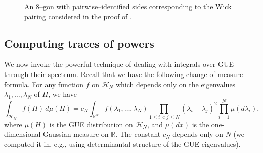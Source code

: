 \documentclass[letterpaper,11pt,oneside,reqno]{book}
\numberwithin{equation}{chapter}  %
\theoremstyle{definition}
\begin{document}
\begin{figure}[htbp]
  \centering
  \caption{An $8$–gon with pairwise–identified sides corresponding to the
           Wick pairing considered in the proof of .}
  \label{lecture15:fig:octagon-gluing}
\end{figure}

\subsection{Computing traces of powers}
\label{lecture15:subsec:traces-powers-computation}

We now invoke the powerful technique of dealing with
integrals over GUE through their spectrum.
Recall that we have the following change of measure formula.
For any function $f$ on $\mathcal{H}_N$ which depends only on the eigenvalues
$\lambda_1,\ldots,\lambda_N$ of $H$, we have
\begin{equation*}
	\int_{\mathcal{H}_N} f(H) \, d\mu(H) =
	c_N
	\int_{\mathbb{R}^N}
	f(\lambda_1,\ldots,\lambda_N) \prod_{1\le i<j\le N}
	(\lambda_i-\lambda_j)^2
	\prod_{i=1}^{N}\mu(d\lambda_i),
\end{equation*}
where $\mu(H)$ is the GUE distribution on $\mathcal{H}_N$, and
$\mu(dx)$ is the one-dimensional Gaussian measure on $\mathbb{R}$.
The constant $c_N$ depends only on $N$ (we computed it in,
e.g.,
 using determinantal structure of the
GUE eigenvalues).
\end{document}

